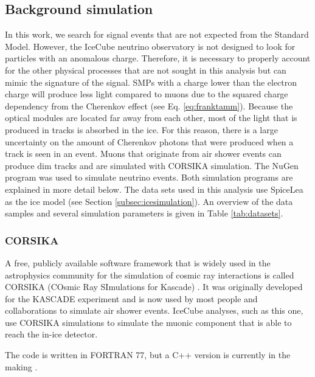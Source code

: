 \subsection{Background simulation}
In this work, we search for signal events that are not expected from the Standard Model. However, the IceCube neutrino observatory is not designed to look for particles with an anomalous charge. Therefore, it is necessary to properly account for the other physical processes that are not sought in this analysis but can mimic the signature of the signal. SMPs with a charge lower than the electron charge will produce less light compared to muons due to the squared charge dependency from the Cherenkov effect (see Eq. \ref{eq:franktamm}). Because the optical modules are located far away from each other, most of the light that is produced in tracks is absorbed in the ice. For this reason, there is a large uncertainty on the amount of Cherenkov photons that were produced when a track is seen in an event. Muons that originate from air shower events can produce dim tracks and are simulated with CORSIKA simulation. The NuGen program was used to simulate neutrino events. Both simulation programs are explained in more detail below. The data sets used in this analysis use SpiceLea as the ice model (see Section \ref{subsec:icesimulation}). An overview of the data samples and several simulation parameters is given in Table \ref{tab:datasets}.

\subsubsection{CORSIKA}
\label{subsub:corsika}
A free, publicly available software framework that is widely used in the astrophysics community for the simulation of cosmic ray interactions is called CORSIKA  (COsmic Ray SImulations for Kascade) \cite{Heck:1998vt}. It was originally developed for the KASCADE experiment and is now used by most people and collaborations to simulate air shower events. IceCube analyses, such as this one, use CORSIKA simulations to simulate the muonic component that is able to reach the in-ice detector.

The code is written in FORTRAN 77, but a C++ version is currently in the making \cite{Engel:2018akg}.\\

